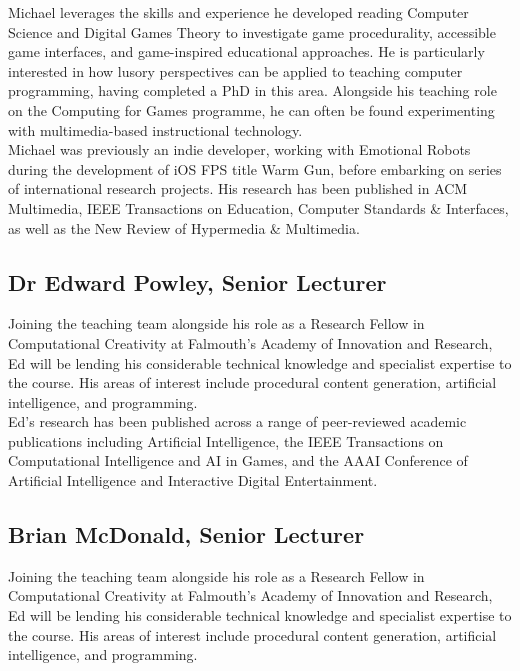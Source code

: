 Michael leverages the skills and experience he developed reading Computer Science and Digital Games Theory to investigate game procedurality, accessible game interfaces, and game-inspired educational approaches. He is particularly interested in how lusory perspectives can be applied to teaching computer programming, having completed a PhD in this area. Alongside his teaching role on the Computing for Games programme, he can often be found experimenting with multimedia-based instructional technology.\\

Michael was previously an indie developer, working with Emotional Robots during the development of iOS FPS title Warm Gun, before embarking on series of international research projects. His research has been published in ACM Multimedia, IEEE Transactions on Education, Computer Standards \& Interfaces, as well as the New Review of Hypermedia \& Multimedia.\\

\subsection{Dr Edward Powley, Senior Lecturer}

Joining the teaching team alongside his role as a Research Fellow in Computational Creativity at Falmouth's Academy of Innovation and Research, Ed will be lending his considerable technical knowledge and specialist expertise to the course. His areas of interest include procedural content generation, artificial intelligence, and programming. \\

Ed's research has been published across a range of peer-reviewed academic publications including Artificial Intelligence, the IEEE Transactions on Computational Intelligence and AI in Games, and the AAAI Conference of Artificial Intelligence and Interactive Digital Entertainment. \\

\subsection{Brian McDonald, Senior Lecturer}

Joining the teaching team alongside his role as a Research Fellow in Computational Creativity at Falmouth's Academy of Innovation and Research, Ed will be lending his considerable technical knowledge and specialist expertise to the course. His areas of interest include procedural content generation, artificial intelligence, and programming. \\

